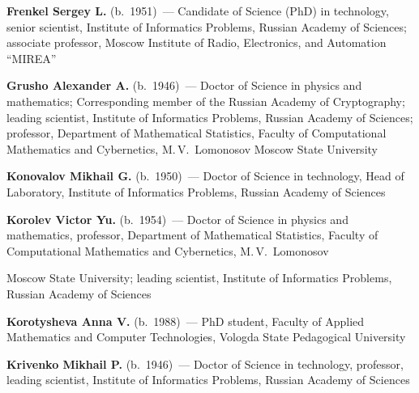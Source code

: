 \begin{multicols}{2}
\vspace*{4pt}

\noindent
\textbf{Frenkel Sergey L.} (b.\ 1951)~--- Candidate of Science (PhD) in technology,
senior scientist, Institute of Informatics Problems, Russian Academy of Sciences;
associate professor, Moscow Institute of Radio, Electronics, and Automation ``MIREA''

\vspace*{4pt}

\noindent
\textbf{Grusho Alexander A.} (b.\ 1946)~--- Doctor of Science in physics 
and mathematics; Corresponding member of the Russian Academy of
Cryptography; leading scientist, Institute of Informatics Problems,  Russian Academy of Sciences;
professor, Department of Mathematical Statistics, 
Faculty of Computational Mathematics and Cybernetics, 
M.\,V.~Lomonosov Moscow State Univer\-sity

\vspace*{4pt}

\noindent
\textbf{Konovalov Mikhail G.} (b.\ 1950)~--- Doctor of Science in technology, 
Head of Laboratory, Institute of Informatics Problems,  Russian Academy of Sciences


\vspace*{4pt}


\noindent
\textbf{Korolev Victor Yu.} (b.\ 1954)~--- Doctor of Science in physics and mathematics, 
professor, Department of Mathematical Statistics, Faculty of Computational Mathematics 
and Cybernetics, M.\,V.~Lomonosov\linebreak\vspace*{-12pt}

\columnbreak

\noindent Moscow State University; 
leading scientist, Institute of Informatics Problems, Russian Academy of Sciences

\vspace*{4pt}

\noindent
\textbf{Korotysheva Anna V.} (b.\ 1988)~--- PhD student, Faculty of Applied Mathematics and
Computer Technologies, Vologda State Pedagogical University

\vspace*{4pt}

\noindent
\textbf{Krivenko Mikhail P.} (b.\ 1946)~--- 
Doctor of Science in technology, professor, leading scientist, 
Institute of Informatics Problems, Russian Academy of Sciences  


\vspace*{4pt}


\end{multicols}
